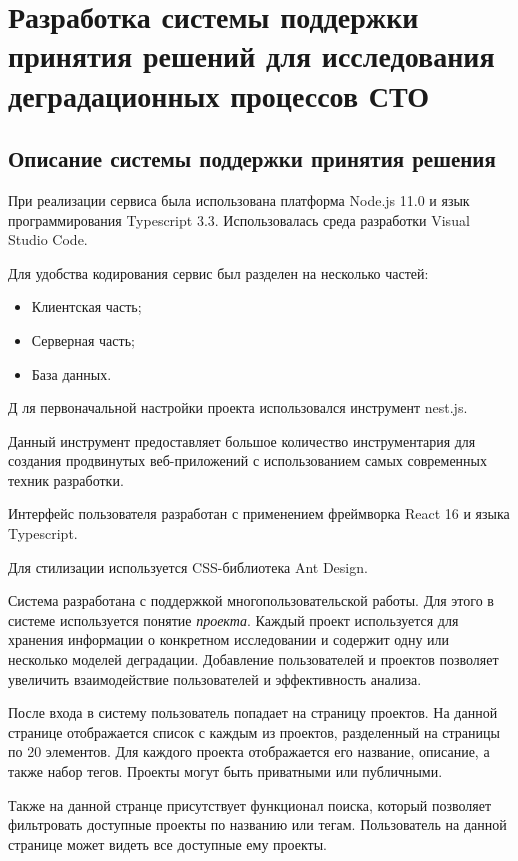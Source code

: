 \section{Разработка системы поддержки принятия решений для исследования деградационных процессов СТО}

\subsection{Описание системы поддержки принятия решения}
При реализации сервиса была использована платформа Node.js 11.0 и язык программирования Typescript 3.3. 
Использовалась среда разработки Visual Studio Code.

Для удобства кодирования сервис был разделен на несколько частей:

\begin{itemize}
    \item Клиентская часть;
    \item Серверная часть;
    \item База данных.
\end{itemize}
Д
ля первоначальной настройки проекта использовался инструмент nest.js. 

Данный инструмент предоставляет большое количество инструментария для создания продвинутых веб-приложений с использованием самых современных техник разработки.

Интерфейс пользователя разработан с применением фреймворка React 16 и языка Typescript.

Для стилизации используется CSS-библиотека Ant Design.

Система разработана с поддержкой многопользовательской работы. 
Для этого в системе используется понятие \emph{проекта}. 
Каждый проект используется для хранения информации о конкретном исследовании и содержит одну или несколько моделей деградации. 
Добавление пользователей и проектов позволяет увеличить взаимодействие пользователей и эффективность анализа. 

После входа в систему пользователь попадает на страницу проектов.
На данной странице отображается список с каждым из проектов, разделенный на страницы по 20 элементов.
Для каждого проекта отображается его название, описание, а также набор тегов. 
Проекты могут быть приватными или публичными.

Также на данной странце присутствует функционал поиска, который позволяет фильтровать доступные проекты по названию или тегам.
Пользователь на данной странице может видеть все доступные ему проекты.

